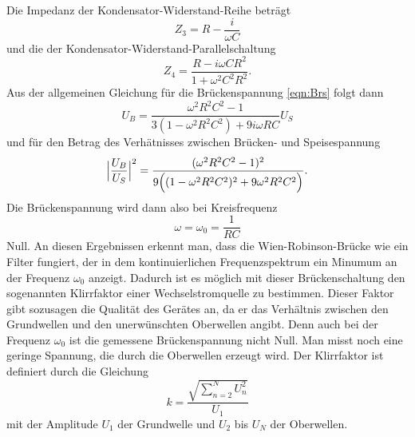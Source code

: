 Die Impedanz der Kondensator-Widerstand-Reihe beträgt
\begin{equation}
  Z_3 = R - \frac{i}{\omega C}
\end{equation}
und die der Kondensator-Widerstand-Parallelschaltung
\begin{equation}
  Z_4 = \frac{R - i\omega C R^2}{1 + \omega^2 C^2 R^2} .
\end{equation}
Aus der allgemeinen Gleichung für die Brückenspannung \eqref{eqn:Brs}
folgt dann
\begin{equation}
  U_B = \frac{\omega^2 R^2 C^2 -1}{3(1 - \omega^2 R^2 C^2) + 9 i \omega R C}U_S
\end{equation}
und für den Betrag des Verhätnisses zwischen Brücken- und Speisespannung
\begin{equation}
  \Bigl|\frac{U_B}{U_S}\Bigr|^2 = \frac{(\omega^2 R^2 C^2 -1)^2}{9\Bigl
  ((1-\omega^2 R^2 C^2)^2 + 9 \omega^2 R^2 C^2\Bigr)} .
  \label{eqn:WRBG}
\end{equation}
Die Brückenspannung wird dann also bei Kreisfrequenz
\begin{equation}
  \omega = \omega_0 = \frac{1}{RC}
\end{equation}
Null.
An diesen Ergebnissen erkennt man, dass die Wien-Robinson-Brücke wie ein
Filter fungiert, der in dem kontinuierlichen Frequenzspektrum ein Minumum
an der Frequenz $\omega_0$ anzeigt. Dadurch ist es möglich mit dieser
Brückenschaltung den sogenannten Klirrfaktor einer Wechselstromquelle zu
bestimmen. Dieser Faktor gibt sozusagen die Qualität des Gerätes an, da er das
Verhältnis zwischen den Grundwellen und den unerwünschten Oberwellen angibt.
Denn auch bei der Frequenz $\omega_0$ ist die gemessene Brückenspannung nicht
Null. Man misst noch eine geringe Spannung, die durch die Oberwellen erzeugt
wird. Der Klirrfaktor ist definiert durch die Gleichung
\begin{equation}
  k = \frac{\sqrt{\sum_{n=2}^N U_n^2}}{U_1}
  \label{eqn:klirrf}
\end{equation}
mit der Amplitude $U_1$ der Grundwelle und $U_2$ bis $U_N$ der Oberwellen.

